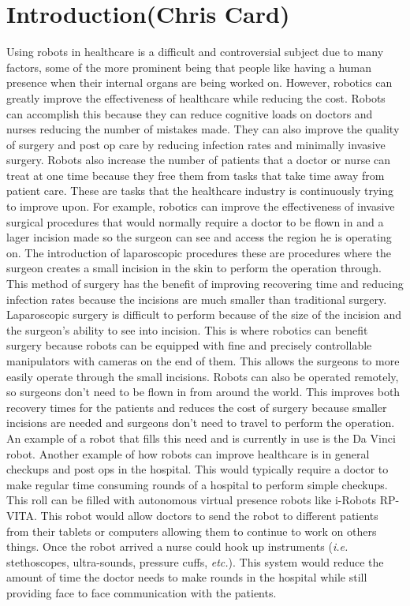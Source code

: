 \documentclass[11pt,conference]{IEEEtran}
\begin{document}
\section{Introduction(Chris Card)}

Using robots in healthcare is a difficult and controversial subject due to many factors, some of the more prominent being that people like having a human presence when their internal organs are being worked on.  However, robotics can greatly improve the effectiveness of healthcare while reducing the cost.  Robots can accomplish this because they can reduce cognitive loads on doctors and nurses reducing the number of mistakes made.  They can also improve the quality of surgery and post op care by reducing infection rates and minimally invasive surgery.  Robots also increase the number of patients that a doctor or nurse can treat at one time because they free them from tasks that take time away from patient care.  These are tasks that the healthcare industry is continuously trying to improve upon.
\newline
For example, robotics can improve the effectiveness of invasive surgical procedures that would normally require a doctor to be flown in and a lager incision made so the surgeon can see and access the region he is operating on.  The introduction of laparoscopic procedures these are procedures where the surgeon creates a small incision in the skin to perform the operation through.  This method of surgery has the benefit of improving recovering time and reducing infection rates because the incisions are much smaller than traditional surgery.  Laparoscopic surgery is difficult to perform because of the size of the incision and the surgeon’s ability to see into incision.  This is where robotics can benefit surgery because robots can be equipped with fine and precisely controllable manipulators with cameras on the end of them.  This allows the surgeons to more easily operate through the small incisions.  Robots can also be operated remotely, so surgeons don’t need to be flown in from around the world.  This improves both recovery times for the patients and reduces the cost of surgery because smaller incisions are needed and surgeons don’t need to travel to perform the operation.  An example of a robot that fills this need and is currently in use is the Da Vinci robot.
\newline
Another example of how robots can improve healthcare is in general checkups and post ops in the hospital.  This would typically require a doctor to make regular time consuming rounds of a hospital to perform simple checkups.  This roll can be filled with autonomous virtual presence robots like i-Robots RP-VITA.  This robot would allow doctors to send the robot to different patients from their tablets or computers allowing them to continue to work on others things.  Once the robot arrived a nurse could hook up instruments (\textit{i.e.} stethoscopes, ultra-sounds, pressure cuffs, \textit{etc.}).  This system would reduce the amount of time the doctor needs to make rounds in the hospital while still providing face to face communication with the patients.
\end{document}
